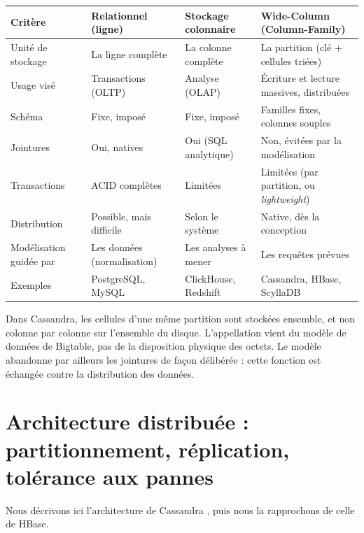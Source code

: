 \documentclass[11pt,a4paper]{article}
\begin{document}
\begin{center}
\small
\begin{tabularx}{\textwidth}{@{}>{\raggedright\arraybackslash}p{2.6cm}>{\raggedright\arraybackslash}X>{\raggedright\arraybackslash}X>{\raggedright\arraybackslash}X@{}}
\toprule
Critère & Relationnel (ligne) & Stockage colonnaire & Wide-Column (Column-Family) \\
\midrule
Unité de stockage & La ligne complète & La colonne complète & La partition (clé + cellules triées) \\
Usage visé & Transactions (OLTP) & Analyse (OLAP) & Écriture et lecture massives, distribuées \\
Schéma & Fixe, imposé & Fixe, imposé & Familles fixes, colonnes souples \\
Jointures & Oui, natives & Oui (SQL analytique) & Non, évitées par la modélisation \\
Transactions & ACID complètes & Limitées & Limitées (par partition, ou \emph{lightweight}) \\
Distribution & Possible, mais difficile & Selon le système & Native, dès la conception \\
Modélisation guidée par & Les données (normalisation) & Les analyses à mener & Les requêtes prévues \\
Exemples & PostgreSQL, MySQL & ClickHouse, Redshift & Cassandra, HBase, ScyllaDB \\
\bottomrule
\end{tabularx}
\end{center}

Dans Cassandra, les cellules d'une même partition sont stockées ensemble, et non colonne par colonne sur l'ensemble du disque. L'appellation vient du modèle de données de Bigtable, pas de la disposition physique des octets. Le modèle abandonne par ailleurs les jointures de façon délibérée : cette fonction est échangée contre la distribution des données.

\section{Architecture distribuée : partitionnement, réplication, tolérance aux pannes}

Nous décrivons ici l'architecture de Cassandra \cite{cassandra,cassdoc}, puis nous la rapprochons de celle de HBase.
\end{document}
